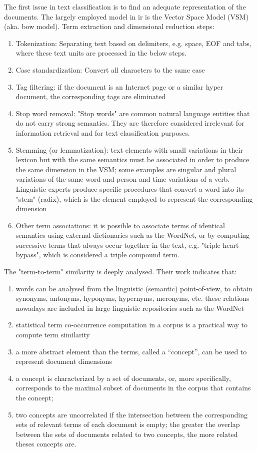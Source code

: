 The first issue in text classification is to find an adequate representation of the documents. 
The largely employed model in \gls{ir} is the Vector Space Model (VSM) (aka. \gls{bow} model).
Term extraction and dimensional reduction steps:
\begin{enumerate}
	\item Tokenization: Separating text based on delimiters, e.g. space, EOF and tabs, where these text units are processed in the below steps.
	\item Case standardization: Convert all characters to the same case
	\item Tag filtering: if the document is an Internet page or a similar hyper document, the corresponding tags are eliminated
	\item Stop word removal: "Stop words" are common natural language entities that do not carry strong semantics. 
	They are therefore considered irrelevant for information retrieval and for text classification purposes. 
	\item Stemming (or lemmatization): text elements with small variations in their lexicon but with the same semantics must be associated in order to produce the same dimension in the VSM; 
	some examples are singular and plural variations of the same word and person and time variations of a verb. 
	Linguistic experts produce specific procedures that convert a word into its "stem" (radix), which is the element employed to represent the corresponding dimension
	\item Other term associations: it is possible to associate terms of identical semantics using external dictionaries such as the WordNet, or by 
	computing successive terms that always occur together in the text, e.g. "triple heart bypass", which is considered a triple compound term.
\end{enumerate}
The "term-to-term" similarity is deeply analysed. Their work indicates that:
\begin{enumerate}
	\item words can be analysed from the linguistic (semantic) point-of-view, to obtain synonyms, antonyms, hyponyms, hypernyms, meronyms, etc.
	these relations nowadays are included in large linguistic repositories such as the WordNet
	\item statistical term co-occurrence computation in a corpus is a practical way to compute term similarity
	\item a more abstract element than the terms, called a “concept”, can be used to represent document dimensions
	\item a concept is characterized by a set of documents, or, more specifically, corresponds to the maximal subset of documents in the corpus that contains the concept;
	\item two concepts are uncorrelated if the intersection between the corresponding sets of relevant terms of each document is empty;
	the greater the overlap between the sets of documents related to two concepts, the more related theses concepts are.
\end{enumerate}
